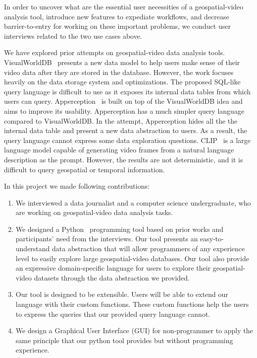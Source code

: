 In order to uncover what are the essential user necessities of a geospatial-video analysis tool, introduce new features to expediate workflows, and decrease barrier-to-entry for working on these important problems, we conduct user interviews related to the two use cases above.

We have explored prior attempts on geospatial-video data analysis tools.
VisualWorldDB~\cite{haynes:visualworlddb} presents a new data model to help users make sense of their video data after they are stored in the database.
However, the work focuses heavily on the data storage system and optimizations.
The proposed SQL-like query language is difficult to use as it exposes its internal data tables from which users can query.
Apperception~\cite{ge:apperception} is built on top of the VisualWorldDB idea and aims to improve its usability.
Apperception has a much simpler query language compared to VisualWorldDB.
In the attempt, Apperception hides all the the internal data table and present a new data abstraction to users.
As a result, the query language cannot express some data exploration questions.
CLIP~\cite{radford:clip} is a large language model capable of generating video frames from a natural language description as the prompt. 
However, the results are not deterministic, and it is difficult to query geospatial or temporal information.

In this project we made following contributions:
\begin{enumerate}
    \item
    We interviewed a data journalist and a computer science undergraduate,
    who are working on geospatial-video data analysis tasks.
    \item
    We designed a Python~\cite{van:python} programming tool based on prior works and participants' need from the interviews.
    Our tool presents an easy-to-understand data abstraction that will allow programmers of any experience level to easily explore large geospatial-video databases. Our tool also provide an expressive domain-specific language for users to explore their geospatial-video datasets through the data abstraction we provided.
    \item
    Our tool is designed to be extensible.
    Users will be able to extend our language with their custom functions.
    These custom functions help the users to express the queries that our provided query language cannot.
    \item
    We design a Graphical User Interface (GUI) for non-programmer to apply the same principle that our python tool provides but without programming experience.
\end{enumerate}
